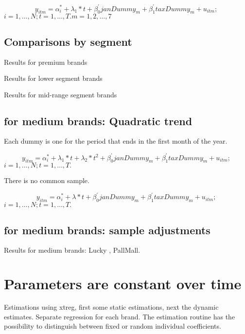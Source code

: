 \documentclass[]{article}
\begin{document}
\begin{equation*} 
	y_{itm}  = \alpha_{i}^{*} + \lambda_{1}*t +\beta_{0}^{'}janDummy_{m} + \beta_{1}^{'}taxDummy_{m} + u_{itm}
	;  
\end{equation*}
$i  = 1,\ldots,N;  t=1,\ldots,T. m = 1,2,\ldots,7$

\subsection{Comparisons by segment}
Results for premium brands



Results for lower segment brands



Results for mid-range segment brands




\subsection{for medium brands: Quadratic trend}
Each dummy is one for the period that ends in the first month of the year. 

\begin{equation*} 
	y_{itm}  = \alpha_{i}^{*} + \lambda_{1}*t +  \lambda_{2}*t^{2} +\beta_{0}^{'}janDummy_{m} + \beta_{1}^{'}taxDummy_{m} + u_{itm}
	;  
\end{equation*}
$i  = 1,\ldots,N;  t=1,\ldots,T. $



There is no common sample. 

\begin{equation*} 
	y_{itm}  = \alpha_{i}^{*} + \lambda*t +  \beta_{0}^{'}janDummy_{m} + \beta_{1}^{'}taxDummy_{m} + u_{itm}
	;  
\end{equation*}
$i  = 1,\ldots,N;  t=1,\ldots,T. $

\subsection{for medium brands: sample adjustments }
Results for medium brands: Lucky , PallMall.



\section{Parameters are constant over time }
Estimations using xtreg, first some static estimations, next the dynamic estimates.
Separate regression for each brand.
The estimation routine has the possibility to distinguish between fixed or random individual coefficients.
\end{document}
